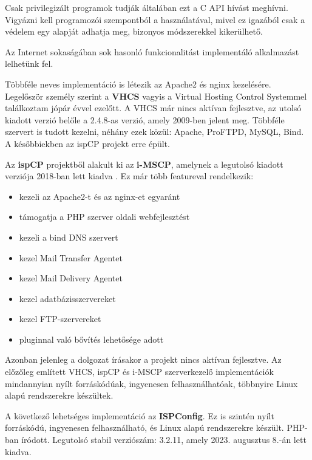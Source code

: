 Csak privilegizált programok tudják általában ezt a C API hívást meghívni. Vigyázni kell programozói szempontból a használatával, mivel ez igazából csak a védelem egy alapját adhatja meg, bizonyos módszerekkel kikerülhető.

Az Internet sokaságában sok hasonló funkcionalitást implementáló alkalmazást lelhetünk fel.

Többféle neves implementáció is létezik az Apache2 és nginx kezelésére. Legelőször személy szerint a \textbf{VHCS} vagyis a Virtual Hosting Control Systemmel találkoztam jópár évvel ezelőtt. A VHCS már nincs aktívan fejlesztve, az utolsó kiadott verzió belőle a 2.4.8-as verzió, amely 2009-ben jelent meg. \cite{vhcs} Többféle szervert is tudott kezelni, néhány ezek közül: Apache, ProFTPD, MySQL, Bind. A későbbiekben az ispCP projekt erre épült. \cite{ispcp} 

Az \textbf{ispCP} projektből alakult ki az \textbf{i-MSCP}, amelynek a legutolsó kiadott verziója 2018-ban lett kiadva \cite{imscp}. Ez már több featureval rendelkezik:
\begin{itemize}
	\item kezeli az Apache2-t és az nginx-et egyaránt
	\item támogatja a PHP szerver oldali webfejlesztést
	\item kezeli a bind DNS szervert
	\item kezel Mail Transfer Agentet
	\item kezel Mail Delivery Agentet
	\item kezel adatbázisszervereket
	\item kezel FTP-szervereket
	\item pluginnal való bővítés lehetősége adott
\end{itemize}
Azonban jelenleg a dolgozat írásakor a projekt nincs aktívan fejlesztve. Az előzőleg említett VHCS, ispCP és i-MSCP szerverkezelő implementációk mindannyian nyílt forráskódúak, ingyenesen felhasználhatóak, többnyire Linux alapú rendszerekre készültek.

A következő lehetséges implementáció az \textbf{ISPConfig}. Ez is szintén nyílt forráskódú, ingyenesen felhasználható, és Linux alapú rendszerekre készült. PHP-ban íródott. Legutolsó stabil verziószám: 3.2.11, amely 2023. augusztus 8.-án lett kiadva. \cite{ispconfig}

\pagebreak

